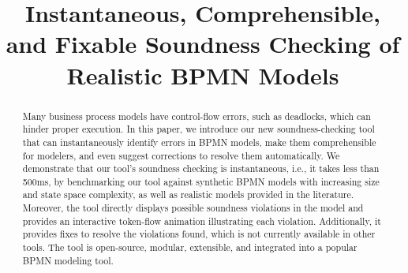 \documentclass[runningheads]{llncs}
\begin{document}
%
\title{Instantaneous, Comprehensible, and Fixable Soundness Checking of Realistic BPMN Models}
%

\maketitle              %
%
\begin{abstract}
Many business process models have control-flow errors, such as deadlocks, which can hinder proper execution.
In this paper, we introduce our new soundness-checking tool that can instantaneously identify errors in BPMN models, make them comprehensible for modelers, and even suggest corrections to resolve them automatically.
We demonstrate that our tool's soundness checking is instantaneous, i.e., it takes less than 500ms, by benchmarking our tool against synthetic BPMN models with increasing size and state space complexity, as well as realistic models provided in the literature.
Moreover, the tool directly displays possible soundness violations in the model and provides an interactive token-flow animation illustrating each violation.
Additionally, it provides fixes to resolve the violations found, which is not currently available in other tools.
The tool is open-source, modular, extensible, and integrated into a popular BPMN modeling tool.

\end{abstract}
\end{document}
